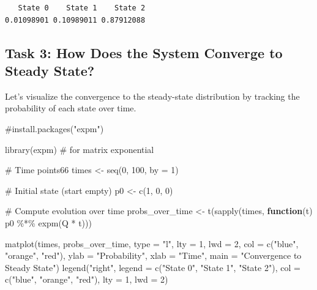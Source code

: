 \documentclass[
]{article}
\newenvironment{Shaded}{\begin{snugshade}}{\end{snugshade}}
\newcommand{\AttributeTok}[1]{\textcolor[rgb]{0.40,0.45,0.13}{#1}}
\newcommand{\CommentTok}[1]{\textcolor[rgb]{0.37,0.37,0.37}{#1}}
\newcommand{\ControlFlowTok}[1]{\textcolor[rgb]{0.00,0.23,0.31}{\textbf{#1}}}
\newcommand{\DecValTok}[1]{\textcolor[rgb]{0.68,0.00,0.00}{#1}}
\newcommand{\FunctionTok}[1]{\textcolor[rgb]{0.28,0.35,0.67}{#1}}
\newcommand{\NormalTok}[1]{\textcolor[rgb]{0.00,0.23,0.31}{#1}}
\newcommand{\OtherTok}[1]{\textcolor[rgb]{0.00,0.23,0.31}{#1}}
\newcommand{\SpecialCharTok}[1]{\textcolor[rgb]{0.37,0.37,0.37}{#1}}
\newcommand{\StringTok}[1]{\textcolor[rgb]{0.13,0.47,0.30}{#1}}
\begin{document}
\begin{verbatim}
   State 0    State 1    State 2 
0.01098901 0.10989011 0.87912088 
\end{verbatim}

\subsection{Task 3: How Does the System Converge to Steady
State?}\label{task-3-how-does-the-system-converge-to-steady-state}

Let's visualize the convergence to the steady-state distribution by
tracking the probability of each state over time.

\begin{Shaded}
\begin{Highlighting}[]
\CommentTok{\#install.packages("expm")}

\FunctionTok{library}\NormalTok{(expm)  }\CommentTok{\# for matrix exponential}

\CommentTok{\# Time points66}
\NormalTok{times }\OtherTok{\textless{}{-}} \FunctionTok{seq}\NormalTok{(}\DecValTok{0}\NormalTok{, }\DecValTok{100}\NormalTok{, }\AttributeTok{by =} \DecValTok{1}\NormalTok{)}

\CommentTok{\# Initial state (start empty)}
\NormalTok{p0 }\OtherTok{\textless{}{-}} \FunctionTok{c}\NormalTok{(}\DecValTok{1}\NormalTok{, }\DecValTok{0}\NormalTok{, }\DecValTok{0}\NormalTok{)}

\CommentTok{\# Compute evolution over time}
\NormalTok{probs\_over\_time }\OtherTok{\textless{}{-}} \FunctionTok{t}\NormalTok{(}\FunctionTok{sapply}\NormalTok{(times, }\ControlFlowTok{function}\NormalTok{(t) p0 }\SpecialCharTok{\%*\%} \FunctionTok{expm}\NormalTok{(Q }\SpecialCharTok{*}\NormalTok{ t)))}

\FunctionTok{matplot}\NormalTok{(times, probs\_over\_time, }\AttributeTok{type =} \StringTok{"l"}\NormalTok{, }\AttributeTok{lty =} \DecValTok{1}\NormalTok{, }\AttributeTok{lwd =} \DecValTok{2}\NormalTok{,}
        \AttributeTok{col =} \FunctionTok{c}\NormalTok{(}\StringTok{"blue"}\NormalTok{, }\StringTok{"orange"}\NormalTok{, }\StringTok{"red"}\NormalTok{),}
        \AttributeTok{ylab =} \StringTok{"Probability"}\NormalTok{, }\AttributeTok{xlab =} \StringTok{"Time"}\NormalTok{,}
        \AttributeTok{main =} \StringTok{"Convergence to Steady State"}\NormalTok{)}
\FunctionTok{legend}\NormalTok{(}\StringTok{"right"}\NormalTok{, }\AttributeTok{legend =} \FunctionTok{c}\NormalTok{(}\StringTok{"State 0"}\NormalTok{, }\StringTok{"State 1"}\NormalTok{, }\StringTok{"State 2"}\NormalTok{),}
       \AttributeTok{col =} \FunctionTok{c}\NormalTok{(}\StringTok{"blue"}\NormalTok{, }\StringTok{"orange"}\NormalTok{, }\StringTok{"red"}\NormalTok{), }\AttributeTok{lty =} \DecValTok{1}\NormalTok{, }\AttributeTok{lwd =} \DecValTok{2}\NormalTok{)}
\end{Highlighting}
\end{Shaded}
\end{document}
